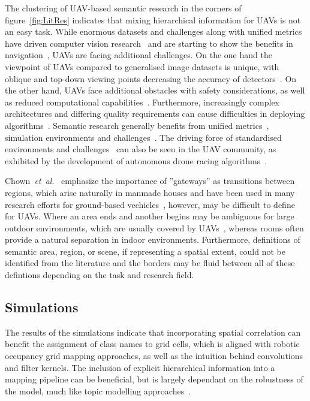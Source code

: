 \documentclass[twocolumn,letterpaper]{IEEEAerospaceCLS}  %
\newcommand{\abbreviation}[1]{\emph{#1}.}
\newcommand{\etal}{\abbreviation{et~al}}
\begin{document}
The clustering of UAV-based semantic research in the corners of figure~\ref{fig:LitRes} indicates that mixing hierarchical information for UAVs is not an easy task. While enormous datasets and challenges along with unified metrics have driven computer vision research~\cite{alom_history_2018,corke_what_2020} and are starting to show the benefits in navigation~\cite{anderson_evaluation_2018,chaplot_object_2020}, UAVs are facing additional challenges.
On the one hand the viewpoint of UAVs compared to generalised image datasets is unique, with oblique and top-down viewing points decreasing the accuracy of detectors~\cite{richardwebster_psyphy:_2019}. On the other hand, UAVs face additional obstacles with safety considerations, as well as reduced computational capabilities~\cite{boroujerdian_mavbench_2018,mandel_method_2020}. Furthermore, increasingly complex architectures and differing quality requirements can cause difficulties in deploying algorithms~\cite{cervera_try_2019,malatova_how_2020}. 
Semantic research generally benefits from unified metrics~\cite{anderson_evaluation_2018}, simulation environments and challenges~\cite{chaplot_object_2020,yang_visual_2018}. The driving force of standardised environments and challenges~\cite{corke_what_2020} can also be seen in the UAV community, as exhibited by the development of autonomous drone racing algorithms~\cite{moon_challenges_2019}.

Chown~\etal~\cite{chown_prototypes_1995} emphasize the importance of ''gateways'' as transitions between regions, which arise naturally in manmade houses and have been used in many research efforts for ground-based vechicles~\cite{kuipers_local_2004,wu_learning_2018,krishnan_visual_2010}, however, may be difficult to define for UAVs. Where an area ends and another begins may be ambiguous for large outdoor environments, which are usually covered by UAVs~\cite{vanegas_novel_2018,shetty_implementation_2020}, whereas rooms often provide a natural separation in indoor environments. Furthermore, definitions of semantic area, region, or scene, if representing a spatial extent, could not be identified from the literature and the borders may be fluid between all of these defintions depending on the task and research field.

\subsection{Simulations} \label{ssec:DiscSim}
The results of the simulations indicate that incorporating spatial correlation can benefit the assignment of class names to grid cells, which is aligned with robotic occupancy grid mapping approaches, as well as the intuition behind convolutions and filter kernels. The inclusion of explicit hierarchical information into a mapping pipeline can be beneficial, but is largely dependant on the robustness of the model, much like topic modelling approaches~\cite{fei-fei_bayesian_2005,blei_latent_2003}.
\end{document}
